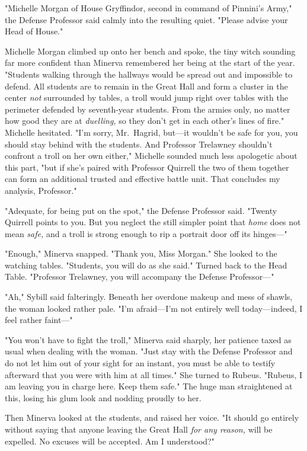 "Michelle Morgan of House Gryffindor, second in command of Pinnini's Army," the
Defense Professor said calmly into the resulting quiet. "Please advise your
Head of House."

Michelle Morgan climbed up onto her bench and spoke, the tiny witch sounding
far more confident than Minerva remembered her being at the start of the year.
"Students walking through the hallways would be spread out and impossible to
defend. All students are to remain in the Great Hall and form a cluster in the
center{\el} \emph{not} surrounded by tables, a troll would jump right over
tables{\el} with the perimeter defended by seventh-year students. From the
armies only, no matter how good they are at \emph{duelling,} so they don't get
in each other's lines of fire." Michelle hesitated. "I'm sorry, Mr.~Hagrid,
but—it wouldn't be safe for you, you should stay behind with the students.
And Professor Trelawney shouldn't confront a troll on her own either," Michelle
sounded much less apologetic about this part, "but if she's paired with
Professor Quirrell the two of them together can form an additional trusted and
effective battle unit. That concludes my analysis, Professor."

"Adequate, for being put on the spot," the Defense Professor said. "Twenty
Quirrell points to you. But you neglect the still simpler point that
\emph{home} does not mean \emph{safe,} and a troll is strong enough to rip a
portrait door off its hinges—"

"Enough," Minerva snapped. "Thank you, Miss Morgan." She looked to the watching
tables. "Students, you will do as she said." Turned back to the Head Table.
"Professor Trelawney, you will accompany the Defense Professor—"

"Ah," Sybill said falteringly. Beneath her overdone makeup and mess of shawls,
the woman looked rather pale. "I'm afraid—I'm not entirely well
today—indeed, I feel rather faint—"

"You won't have to fight the troll," Minerva said sharply, her patience taxed
as usual when dealing with the woman. "Just stay with the Defense Professor and
do not let him out of your sight for an instant, you must be able to testify
afterward that you were with him at all times." She turned to Rubeus.
"Rubeus, I am leaving you in charge here. Keep them safe." The huge man
straightened at this, losing his glum look and nodding proudly to her.

Then Minerva looked at the students, and raised her voice. "It should go
entirely without saying that anyone leaving the Great Hall \emph{for any
reason,} will be expelled. No excuses will be accepted. Am I understood?"


